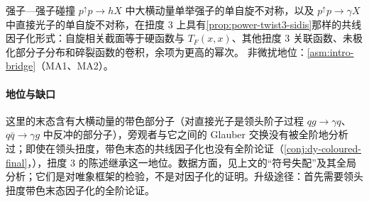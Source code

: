 \begin{conjecture}\label{conj:power-twist3-pp}
强子—强子碰撞 $p^\uparrow p\to hX$ 中大横动量单举强子的单自旋不对称\cite{QiuSterman1991c,Qiu:1998ia}，以及 $p^\uparrow p\to\gamma X$ 中直接光子的单自旋不对称\cite{QiuSterman1992}，在扭度 3 上具有\cref{prop:power-twist3-sidis}那样的共线因子化形式：自旋相关截面等于硬函数与 $T_F(x,x)$、其他扭度 3 关联函数、未极化部分子分布和碎裂函数的卷积，余项为更高的幂次。
非微扰地位：\cref{asm:intro-bridge}（MA1、MA2）。
\end{conjecture}

\paragraph{地位与缺口}
这里的末态含有大横动量的带色部分子（对直接光子是领头阶子过程 $qg\to\gamma q$、$q\bar q\to\gamma g$ 中反冲的部分子），旁观者与它之间的 Glauber 交换没有被全阶地分析过；即使在领头扭度，带色末态的共线因子化也没有全阶论证（\cref{conj:dy-coloured-final}，\tagC），扭度 3 的陈述继承这一地位。数据方面，见上文的“符号失配”\cite{Kang:2011hk}及其全局分析\cite{Cammarota:2020qcw}；它们是对唯象框架的检验，不是对因子化的证明。升级途径：首先需要领头扭度带色末态因子化的全阶论证。

